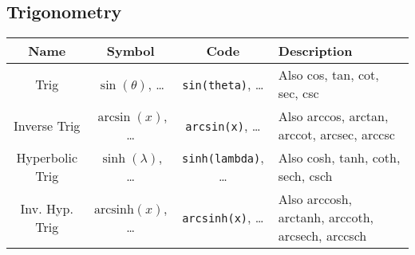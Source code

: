 \documentclass{article}
\begin{document}
  \subsection{Trigonometry} %
  \label{sub:trigonometry}
  \begin{table}[!h]
    \centering
    \begin{tabular}{|c|c|c|l|}
      \hline
      \textbf{Name} & \textbf{Symbol} & \textbf{Code} & \textbf{Description} \\
      \hline\hline
      Trig & \( \sin(\theta) \), \ldots & \texttt{sin(theta)}, \ldots & Also cos, tan, cot, sec, csc \\
      Inverse Trig & \( \arcsin(x) \), \ldots & \texttt{arcsin(x)}, \ldots & Also arccos, arctan, arccot, arcsec, arccsc \\
      Hyperbolic Trig & \( \sinh(\lambda) \), \ldots & \texttt{sinh(lambda)}, \ldots & Also cosh, tanh, coth, sech, csch \\
      Inv. Hyp. Trig & \( \mathrm{arcsinh}(x) \), \ldots & \texttt{arcsinh(x)}, \ldots & Also arccosh, arctanh, arccoth, arcsech, arccsch \\
      \hline
    \end{tabular}
  \end{table}

  \newpage
\end{document}
